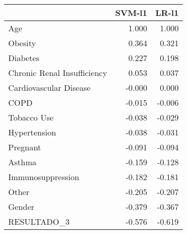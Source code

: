 \begin{tabular}{lrr}
\toprule
{} &  SVM-l1 &  LR-l1 \\
\midrule
Age                         &   1.000 &  1.000 \\
Obesity                     &   0.364 &  0.321 \\
Diabetes                    &   0.227 &  0.198 \\
Chronic Renal Insufficiency &   0.053 &  0.037 \\
Cardiovascular Disease      &  -0.000 &  0.000 \\
COPD                        &  -0.015 & -0.006 \\
Tobacco Use                 &  -0.038 & -0.029 \\
Hypertension                &  -0.038 & -0.031 \\
Pregnant                    &  -0.091 & -0.094 \\
Asthma                      &  -0.159 & -0.128 \\
Immunosuppression           &  -0.182 & -0.181 \\
Other                       &  -0.205 & -0.207 \\
Gender                      &  -0.379 & -0.367 \\
RESULTADO\_3                 &  -0.576 & -0.619 \\
\bottomrule
\end{tabular}
